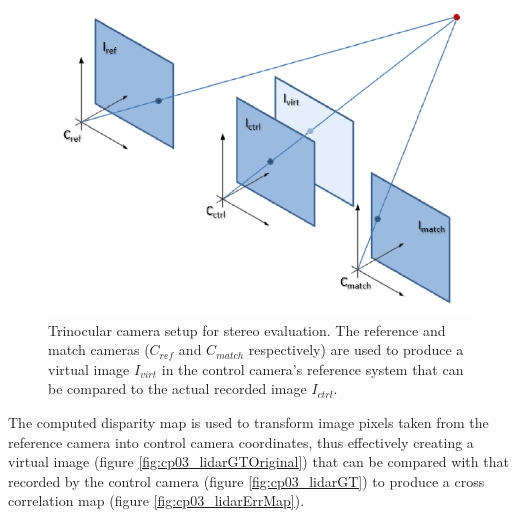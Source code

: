 \begin{figure}[h!]
\centering
\includegraphics{trinocular_setup}
\caption{Trinocular camera setup for stereo evaluation. The reference and match cameras ($C_{ref}$ and $C_{match}$ respectively) are used to produce a virtual image $I_{virt}$ in the control camera’s reference system that can be compared to the actual recorded image $I_{ctrl}$.}\label{fig:cp03_trinocular_setup}
\end{figure}
   
The computed disparity map is used to transform image pixels taken from the reference camera into control camera coordinates, thus effectively creating a virtual image (figure \ref{fig:cp03_lidarGTOriginal}) that can be compared with that recorded by the control camera (figure \ref{fig:cp03_lidarGT}) to produce a cross correlation map (figure \ref{fig:cp03_lidarErrMap}). 

